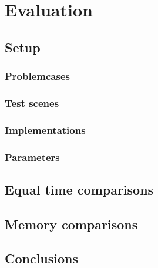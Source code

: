 \chapter{Evaluation}
\label{ch:Evaluation}

\section{Setup}

\subsection{Problemcases}


\subsection{Test scenes}


\subsection{Implementations}


\subsection{Parameters}


\section{Equal time comparisons}

\section{Memory comparisons}

\section{Conclusions}
